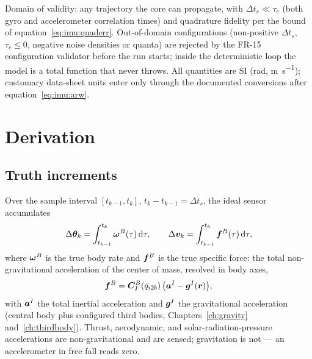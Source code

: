 Domain of validity: any trajectory the core can propagate, with
$\Delta t_s \ll \tau_c$ (both gyro and accelerometer correlation times)
and quadrature fidelity per the bound of
equation~\eqref{eq:imu:quaderr}. Out-of-domain configurations
(non-positive $\Delta t_s$, $\tau_c \le 0$, negative noise densities or
quanta) are rejected by the FR-15 configuration validator before the run
starts; inside the deterministic loop the model is a total function that
never throws. All quantities are SI (\unit{\radian},
\unit{\metre\per\second}); customary data-sheet units enter only through
the documented conversions after
equation~\eqref{eq:imu:arw}.

\section{Derivation}
\label{sec:imu:derivation}

\subsection{Truth increments}
\label{sec:imu:truth}

Over the sample interval $[t_{k-1}, t_k]$, $t_k - t_{k-1} = \Delta t_s$,
the ideal sensor accumulates
\begin{equation}
  \Delta\bm{\theta}_k = \int_{t_{k-1}}^{t_k} \bm{\omega}^{B}(\tau)\,
    \mathrm{d}\tau,
  \qquad
  \Delta\bm{v}_k = \int_{t_{k-1}}^{t_k} \bm{f}^{B}(\tau)\,\mathrm{d}\tau,
  \label{eq:imu:dtheta}
\end{equation}
where $\bm{\omega}^{B}$ is the true body rate and $\bm{f}^{B}$ is the
true specific force: the total non-gravitational acceleration of the
center of mass, resolved in body axes,
\begin{equation}
  \bm{f}^{B} = \bm{C}_{I}^{B}(\bar{q}_{i2b})\,
    \bigl(\bm{a}^{I} - \bm{g}^{I}(\bm{r})\bigr),
  \label{eq:imu:specificforce}
\end{equation}
with $\bm{a}^{I}$ the total inertial acceleration and $\bm{g}^{I}$ the
gravitational acceleration (central body plus configured third bodies,
Chapters~\ref{ch:gravity} and~\ref{ch:thirdbody}). Thrust, aerodynamic,
and solar-radiation-pressure accelerations are non-gravitational and are
sensed; gravitation is not --- an accelerometer in free fall reads zero.

